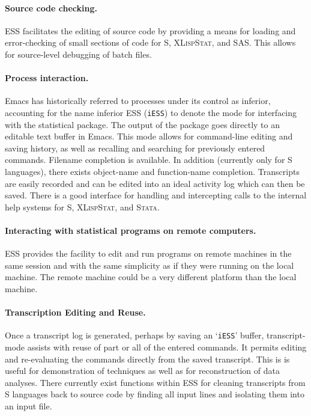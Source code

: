 \documentclass{article}
\newcommand*{\XLispStat}{\textsc{XLispStat}}
\newcommand*{\Stata}{\textsc{Stata}}
\newcommand{\stexttt}[1]{{\small\texttt{#1}}}
\newcommand{\file}[1]{`\stexttt{#1}'}
\begin{document}
\paragraph{Source code checking.}
ESS facilitates the editing of source code by providing a means for
loading and error-checking of small sections of code for S,
\XLispStat, and SAS.  This allows for source-level debugging of batch
files.

\paragraph{Process interaction.}
Emacs has historically referred to processes under its control as
inferior, accounting for the name inferior ESS (\stexttt{iESS}) to
denote the mode for interfacing with the statistical package.  The
output of the package goes directly to an editable text buffer in
Emacs.  This mode allows for command-line editing and saving history,
as well as recalling and searching for previously entered commands.
Filename completion is available.  In addition (currently only for
S languages), there exists object-name and function-name completion.
Transcripts are easily recorded and can be edited into an ideal
activity log which can then be saved.  There is a good interface for
handling and intercepting calls to the internal help systems for S,
\XLispStat, and \Stata.

\paragraph{Interacting with statistical programs on remote computers.}
ESS provides the facility to edit and run programs on remote machines
in the same session and with the same simplicity as if they were
running on the local machine.  The remote machine could be a very
different platform than the local machine.

\paragraph{Transcription Editing and Reuse.}
Once a transcript log is generated, perhaps by saving an \file{iESS}
buffer, transcript-mode assists with reuse of part or all of the
entered commands.  It permits editing and re-evaluating the commands
directly from the saved transcript.  This is is useful for
demonstration of techniques as well as for reconstruction of data
analyses.  There currently exist functions within ESS for cleaning
transcripts from S languages back to source code by finding all input
lines and isolating them into an input file.
\end{document}
